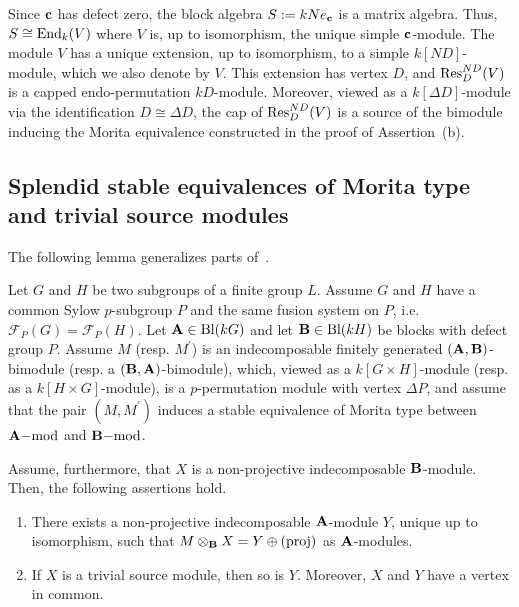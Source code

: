 \begin{rem}\label{rem:ProofFong2ndRed}%
       Since ${\mathbf{c}}$ has defect zero, the block algebra $S:=kNe_{{\mathbf{c}}}$ is a matrix algebra. Thus, $S\cong\operatorname{End}_k(V)$ where $V$ is, up to isomorphism, the unique simple ${\mathbf{c}}$-module. The module $V$ has a unique extension, up to isomorphism, to a simple $k[ND]$-module, which we also denote by $V$. This extension has vertex $D$, and $\operatorname{Res}_D^{ND}(V)$ is a capped endo-permutation $kD$-module. Moreover, viewed as a $k[\Delta D]$-module via the identification $D\cong\Delta D$, the cap of $\operatorname{Res}_D^{ND}(V)$ is a source of the bimodule inducing the Morita equivalence constructed in the proof of Assertion~{\rm(b)}.
\end{rem}




\vspace{2mm}
\subsection{Splendid stable equivalences of Morita type and trivial source modules}
The following lemma generalizes parts of~\cite[Lemma A.3]{KMN11}. 

\begin{lem}\label{lem:stablesplendid_and_pperm_modules}
     Let $G$ and $H$ be two subgroups of a finite group $L$. Assume  $G$ and $H$ have a common Sylow $p$-subgroup $P$ and the same fusion system on $P$, i.e. $\mathcal{F}_P(G)=\mathcal{F}_P(H)$.
     Let ${\mathbf{A}}\in\operatorname{Bl}(kG)$ and let ${\mathbf{B}}\in\operatorname{Bl}(kH)$ be blocks with defect group $P$. Assume
     $M$ (resp. $M^{\prime}$) is an indecomposable  finitely generated $({\mathbf{A}},{\mathbf{B}})$-bimodule (resp. a $({\mathbf{B}},{\mathbf{A}})$-bimodule),  which,  
     viewed as a $k[G\times H]$-module (resp. as a $k[H\times G]$-module), is  a $p$-permutation module with vertex $\Delta P$, and assume that the pair $(M, M^{\prime})$ induces a stable equivalence of Morita type between ${\mathbf{A}}\mathrm{-mod}$ and ${\mathbf{B}}\mathrm{-mod}$.
     \par
     Assume, furthermore, that $X$ is a non-projective indecomposable ${\mathbf{B}}$-module. Then, the following assertions hold.
     \begin{enumerate}[label={\rm(\alph*)}]
         \item There exists a non-projective indecomposable ${\mathbf{A}}$-module $Y$, unique up to isomorphism, such that $M\otimes_{{\mathbf{B}}}X = Y\oplus (\mathrm{proj})$ as ${\mathbf{A}}$-modules. 
         \item If $X$ is a trivial source module, then so is $Y$. Moreover, $X$ and $Y$ have a vertex in common.
     \end{enumerate}
\end{lem}

